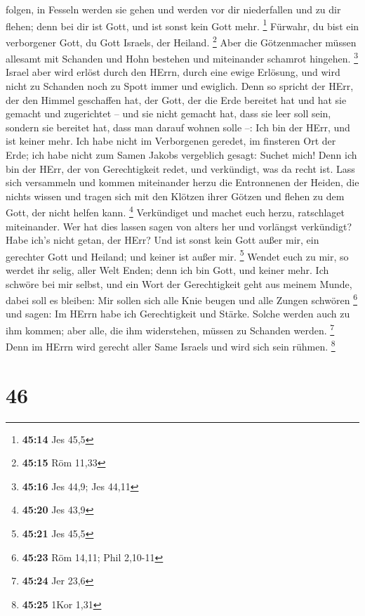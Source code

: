 folgen, in Fesseln werden sie gehen und werden vor dir niederfallen und
zu dir flehen; denn bei dir ist Gott, und ist sonst kein Gott mehr.
\footnote{\textbf{45:14} Jes 45,5}  Fürwahr, du bist ein
verborgener Gott, du Gott Israels, der Heiland. \footnote{\textbf{45:15}
  Röm 11,33}  Aber die Götzenmacher müssen allesamt mit
Schanden und Hohn bestehen und miteinander schamrot hingehen.
\footnote{\textbf{45:16} Jes 44,9; Jes 44,11}  Israel aber
wird erlöst durch den HErrn, durch eine ewige Erlösung, und wird nicht
zu Schanden noch zu Spott immer und ewiglich.  Denn so
spricht der HErr, der den Himmel geschaffen hat, der Gott, der die Erde
bereitet hat und hat sie gemacht und zugerichtet -- und sie nicht
gemacht hat, dass sie leer soll sein, sondern sie bereitet hat, dass man
darauf wohnen solle --: Ich bin der HErr, und ist keiner mehr.
 Ich habe nicht im Verborgenen geredet, im finsteren Ort
der Erde; ich habe nicht zum Samen Jakobs vergeblich gesagt: Suchet
mich! Denn ich bin der HErr, der von Gerechtigkeit redet, und
verkündigt, was da recht ist.  Lass sich versammeln und
kommen miteinander herzu die Entronnenen der Heiden, die nichts wissen
und tragen sich mit den Klötzen ihrer Götzen und flehen zu dem Gott, der
nicht helfen kann. \footnote{\textbf{45:20} Jes 43,9} 
Verkündiget und machet euch herzu, ratschlaget miteinander. Wer hat dies
lassen sagen von alters her und vorlängst verkündigt? Habe ich's nicht
getan, der HErr? Und ist sonst kein Gott außer mir, ein gerechter Gott
und Heiland; und keiner ist außer mir. \footnote{\textbf{45:21} Jes 45,5}
 Wendet euch zu mir, so werdet ihr selig, aller Welt Enden;
denn ich bin Gott, und keiner mehr.  Ich schwöre bei mir
selbst, und ein Wort der Gerechtigkeit geht aus meinem Munde, dabei soll
es bleiben: Mir sollen sich alle Knie beugen und alle Zungen schwören
\footnote{\textbf{45:23} Röm 14,11; Phil 2,10-11}  und
sagen: Im HErrn habe ich Gerechtigkeit und Stärke. Solche werden auch zu
ihm kommen; aber alle, die ihm widerstehen, müssen zu Schanden werden.
\footnote{\textbf{45:24} Jer 23,6}  Denn im HErrn wird
gerecht aller Same Israels und wird sich sein rühmen. \footnote{\textbf{45:25}
  1Kor 1,31}

\hypertarget{section-16}{%
\section{46}\label{section-16}}

